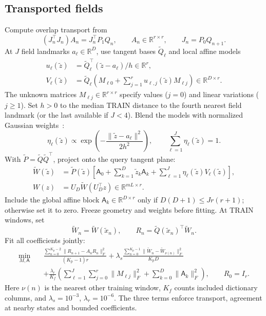 \documentclass[11pt,a4paper]{article}
\newcommand{\R}{\mathbb R}
\begin{document}
\subsection*{Transported fields}
\label{app:field-model}
Compute overlap transport from
\[
(J_n^\top J_n)A_n=J_n^\top P_1Q_n,\qquad A_n\in\R^{r\times r},
\qquad J_n=P_0Q_{n+1}.
\]
At $J$ field landmarks $a_\ell\in\R^D$, use tangent bases
$\widetilde Q_\ell$ and local affine models
\[
\begin{aligned}
u_\ell(\widetilde z)
&=\widetilde Q_\ell^\top(\widetilde z-a_\ell)/h\in\R^r,\\
V_\ell(\widetilde z)
&=\widetilde Q_\ell
\left(M_{\ell0}+\sum_{j=1}^r u_{\ell,j}(\widetilde z)M_{\ell j}\right)
\in\R^{D\times r}.
\end{aligned}
\]
The unknown matrices $M_{\ell j}\in\R^{r\times r}$ specify values
($j=0$) and linear variations ($j\ge1$).
Set $h>0$ to the median TRAIN distance to the fourth nearest field landmark
(or the last available if $J<4$).
Blend the models with normalized Gaussian weights~\citep{MelenkBabuska1996}:
\[
\eta_\ell(\widetilde z)\propto
\exp\!\left(-\frac{\|\widetilde z-a_\ell\|^2}{2h^2}\right),
\qquad \sum_{\ell=1}^J\eta_\ell(\widetilde z)=1.
\]
With $\widetilde P=\widetilde Q\widetilde Q^\top$, project onto the query tangent plane:
\[
\begin{aligned}
\widetilde W(\widetilde z)
&=\widetilde P(\widetilde z)
\left[\mathsf A_0+\sum_{k=1}^D\widetilde z_k\mathsf A_k+
\sum_{\ell=1}^J\eta_\ell(\widetilde z)V_\ell(\widetilde z)\right],\\
W(z)&=U_D\widetilde W(U_D^\top z)\in\R^{mL\times r}.
\end{aligned}
\]
Include the global affine block $\mathsf A_k\in\R^{D\times r}$ only if
$D(D+1)\le Jr(r+1)$; otherwise set it to zero.
Freeze geometry and weights before fitting. At TRAIN windows, set
\[
\widetilde W_n=\widetilde W(\widetilde x_n),\qquad
R_n=\widetilde Q(\widetilde x_n)^\top\widetilde W_n.
\]
Fit all coefficients jointly:
\[
\begin{aligned}
\min_{M,\mathsf A}\quad&
\frac{\sum_{n=0}^{K_{\mathrm p}-2}
\|R_{n+1}-A_nR_n\|_F^2}{(K_{\mathrm p}-1)r}
+\lambda_s\frac{\sum_{n=0}^{K_{\mathrm p}-1}
\|\widetilde W_n-\widetilde W_{\nu(n)}\|_F^2}{K_{\mathrm p}D}\\
&+\frac{\lambda_r}{K_f}\left(
\sum_{\ell=1}^J\sum_{j=0}^r\|M_{\ell j}\|_F^2+
\sum_{k=0}^D\|\mathsf A_k\|_F^2\right),\qquad R_0=I_r.
\end{aligned}
\]
Here $\nu(n)$ is the nearest other training window, $K_f$ counts included
dictionary columns, and $\lambda_s=10^{-3}$, $\lambda_r=10^{-6}$.
The three terms enforce transport, agreement at nearby states and bounded
coefficients.
\end{document}
